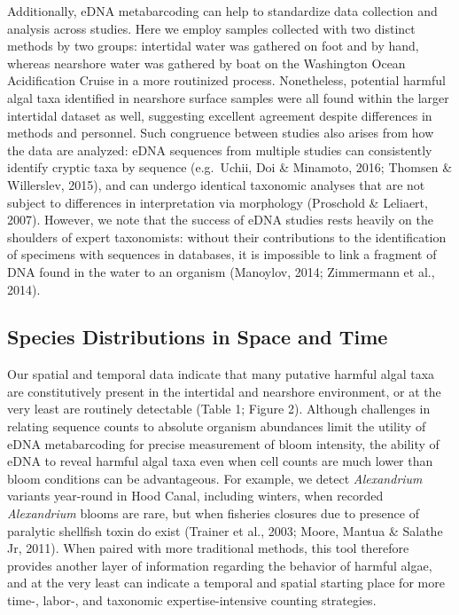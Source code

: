 \documentclass[
]{article}
\begin{document}
Additionally, eDNA metabarcoding can help to standardize data collection
and analysis across studies. Here we employ samples collected with two
distinct methods by two groups: intertidal water was gathered on foot
and by hand, whereas nearshore water was gathered by boat on the
Washington Ocean Acidification Cruise in a more routinized process.
Nonetheless, potential harmful algal taxa identified in nearshore
surface samples were all found within the larger intertidal dataset as
well, suggesting excellent agreement despite differences in methods and
personnel. Such congruence between studies also arises from how the data
are analyzed: eDNA sequences from multiple studies can consistently
identify cryptic taxa by sequence (e.g.~Uchii, Doi \& Minamoto, 2016;
Thomsen \& Willerslev, 2015), and can undergo identical taxonomic
analyses that are not subject to differences in interpretation via
morphology (Proschold \& Leliaert, 2007). However, we note that the
success of eDNA studies rests heavily on the shoulders of expert
taxonomists: without their contributions to the identification of
specimens with sequences in databases, it is impossible to link a
fragment of DNA found in the water to an organism (Manoylov, 2014;
Zimmermann et al., 2014).

\hypertarget{species-distributions-in-space-and-time-2}{%
\subsection{Species Distributions in Space and
Time}\label{species-distributions-in-space-and-time-2}}

Our spatial and temporal data indicate that many putative harmful algal
taxa are constitutively present in the intertidal and nearshore
environment, or at the very least are routinely detectable (Table 1;
Figure 2). Although challenges in relating sequence counts to absolute
organism abundances limit the utility of eDNA metabarcoding for precise
measurement of bloom intensity, the ability of eDNA to reveal harmful
algal taxa even when cell counts are much lower than bloom conditions
can be advantageous. For example, we detect \emph{Alexandrium} variants
year-round in Hood Canal, including winters, when recorded
\emph{Alexandrium} blooms are rare, but when fisheries closures due to
presence of paralytic shellfish toxin do exist (Trainer et al., 2003;
Moore, Mantua \& Salathe Jr, 2011). When paired with more traditional
methods, this tool therefore provides another layer of information
regarding the behavior of harmful algae, and at the very least can
indicate a temporal and spatial starting place for more time-, labor-,
and taxonomic expertise-intensive counting strategies.
\end{document}

